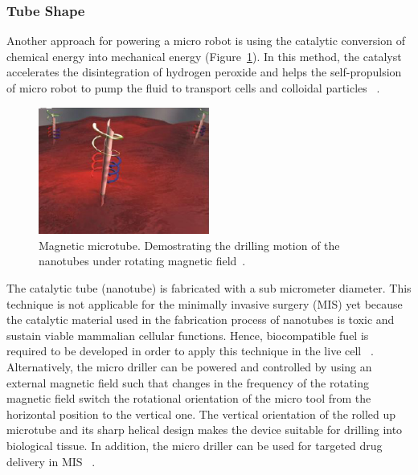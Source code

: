 \documentclass[a4paper,11pt]{article}
\begin{document}
\begin{sloppypar}
\paragraph{}
\subsubsection{Tube Shape}



Another approach for powering a micro robot is using the catalytic conversion of chemical energy
 into mechanical energy (Figure~\ref{nanotube}). In this method, the catalyst accelerates the disintegration of hydrogen peroxide
 and helps the self-propulsion of micro robot to pump the fluid to transport cells and colloidal 
particles ~\citep{C2NR32798H}.

\begin{figure}
  \begin{center}
    \includegraphics[width=0.5\textwidth]{nanoJet3}
  \caption{Magnetic microtube. Demostrating the drilling motion of the nanotubes under rotating
 magnetic field~\citep{C2NR32798H}.}
  \label{nanotube}
\end{center}
\end{figure}

The catalytic tube (nanotube) is fabricated with a sub micrometer diameter.
 This technique is not applicable for the minimally invasive surgery (MIS) yet because the catalytic
 material used in the fabrication process of nanotubes is toxic and sustain viable mammalian cellular 
functions. Hence, biocompatible fuel is required to be developed in order to apply this technique in the 
live cell ~\citep{C2NR32798H}.
Alternatively, the micro driller can be powered and controlled by using an external magnetic field 
such that changes in the frequency of the rotating magnetic field switch the rotational orientation of the 
micro tool from the horizontal position to the vertical one. The vertical orientation of the rolled up microtube 
and its sharp helical design makes the device suitable for drilling into biological tissue. In addition, the micro 
driller can be used for targeted drug delivery in MIS ~\citep{C2NR32798H}. 





\end{sloppypar}
\end{document}
